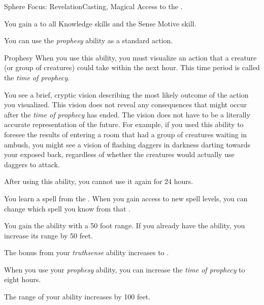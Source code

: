     \begin{feat}{Sphere Focus: Revelation}{Casting, Magical}
        \featpre Access to the  .

         You gain a   to all Knowledge skills and the Sense Motive skill.

         You can use the \textit{prophesy} ability as a standard action.
        \begin{apability}{Prophesy}
            When you use this ability, you must visualize an action that a creature (or group of creatures) could take within the next hour.
            This time period is called the \textit{time of prophecy}.

            You see a brief, cryptic vision describing the most likely outcome of the action you visualized.
            This vision does not reveal any consequences that might occur after the \textit{time of prophecy} has ended.
            The vision does not have to be a literally accurate representation of the future.
            For example, if you used this ability to foresee the results of entering a room that had a group of creatures waiting in ambush, you might see a vision of flashing daggers in darkness darting towards your exposed back, regardless of whether the creatures would actually use daggers to attack.

            After using this ability, you cannot use it again for 24 hours.
        \end{apability}

         You learn a spell from the  .
        When you gain access to new spell levels, you can change which spell you know from that .

         You gain the  ability with a 50 foot range.
        If you already have the  ability, you increase its range by 50 feet.

         The bonus from your \textit{truthsense} ability increases to .

         When you use your \textit{prophesy} ability, you can increase the \textit{time of prophecy} to eight hours.

         The range of your  ability increases by 100 feet.
    \end{feat}

